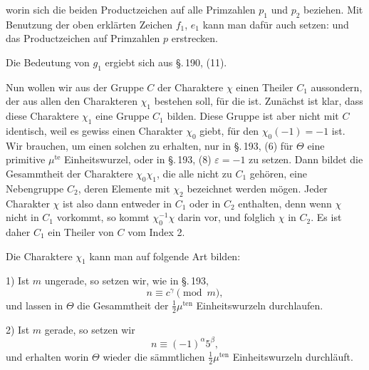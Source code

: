 worin sich die beiden Productzeichen auf alle Primzahlen $p_1$ und
$p_2$ beziehen. Mit Benutzung der oben erklärten Zeichen $f_1$,
$e_1$ kann man dafür auch setzen:
und das Productzeichen auf  Primzahlen $p$ erstrecken.

Die Bedeutung von $g_1$ ergiebt sich aus \S.\,190, (11).

Nun wollen wir aus der Gruppe $C$ der Charaktere $\chi$ einen
Theiler $C_1$ aussondern, der aus allen den Charakteren $\chi_1$
bestehen soll, für die
ist. Zunächst ist klar, dass diese Charaktere $\chi_1$ eine Gruppe
$C_1$ bilden. Diese Gruppe ist aber nicht mit $C$ identisch, weil
es gewiss einen Charakter $\chi_0$ giebt, für den $\chi_0(-1) = -1$
ist. Wir brauchen, um einen solchen zu erhalten, nur in \S.\,193,
(6) für $\Theta$ eine primitive $\mu^{\text{te}}$ Einheitswurzel,
oder in \S.\,193, (8) $\varepsilon = -1$ zu setzen. Dann bildet die
Gesammtheit der Charaktere $\chi_0\chi_1$, die alle nicht zu $C_1$
gehören, eine Nebengruppe $C_2$, deren Elemente mit $\chi_2$
bezeichnet werden mögen. Jeder Charakter $\chi$ ist also dann
entweder in $C_1$ oder in $C_2$ enthalten, denn wenn $\chi$ nicht
in $C_1$ vorkommt, so kommt $\chi_0^{-1}\chi$ darin vor, und
folglich $\chi$ in $C_2$. Es ist daher $C_1$ ein Theiler von $C$
vom Index 2.

Die Charaktere $\chi_1$ kann man auf folgende Art bilden:

1) Ist $m$ ungerade, so setzen wir, wie in \S.\,193,
\[ n \equiv c^{\gamma} \pmod{m}, \]
und lassen in
$\Theta$ die Gesammtheit der $\tfrac12\mu^{\text{ten}}$
Einheitswurzeln durchlaufen.

2) Ist $m$ gerade, so setzen wir
\[ n \equiv (-1)^{\alpha}5^{\beta}, \]
und erhalten
worin $\Theta$ wieder die sämmtlichen $\tfrac12\mu^{\text{ten}}$
Einheitswurzeln durchläuft.
